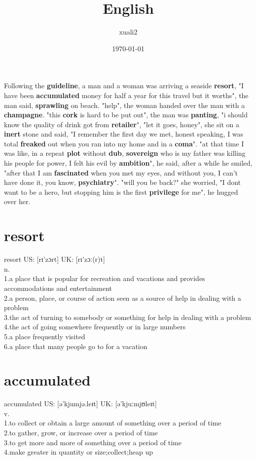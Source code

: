 \documentclass[11pt]{article}
\author{xuali2}
\date{\today}
\title{English}
\begin{document}
\maketitle
\tableofcontents

Following the \textbf{guideline}, a man and a woman was arriving a seaside \textbf{resort}, "I have been \textbf{accumulated} money for half a year for this travel but it worths", the man said, \textbf{sprawling} on beach. "help", the woman handed over the man with a \textbf{champagne}. "this \textbf{cork} is hard to be put out", the man was \textbf{panting}, "i should know the quality of drink got from \textbf{retailer}", "let it goes, honey", she sit on a \textbf{inert} stone and said, "I remember the first day we met, honest speaking, I was total \textbf{freaked} out when you ran into my home and in a \textbf{coma}". "at that time I was like, in a repeat \textbf{plot} without \textbf{dub}, \textbf{sovereign} who is my father was killing his people for power, I felt his evil by \textbf{ambition}", he said, after a while he smiled, "after that I am \textbf{fascinated} when you met my eyes, and without you, I can't have done it, you know, \textbf{psychiatry}". "will you be back?" she worried, "I dont want to be a hero, but stopping him is the first \textbf{privilege} for me", he hugged over her.\\
\section{resort}
\label{sec:org865a114}
resort US: [rɪ'zɔrt] UK: [rɪ'zɔː(r)t]\\
n.\\
1.a place that is popular for recreation and vacations and provides accommodations and entertainment\\
2.a person, place, or course of action seen as a source of help in dealing with a problem\\
3.the act of turning to somebody or something for help in dealing with a problem\\
4.the act of going somewhere frequently or in large numbers\\
5.a place frequently visited\\
6.a place that many people go to for a vacation\\
\section{accumulated}
\label{sec:orgc715da1}
accumulated US: [ə'kjumjə.leɪt] UK: [ə'kjuːmjʊleɪt]\\
v.\\
1.to collect or obtain a large amount of something over a period of time\\
2.to gather, grow, or increase over a period of time\\
3.to get more and more of something over a period of time\\
4.make greater in quantity or size;collect;heap up\\
\end{document}
